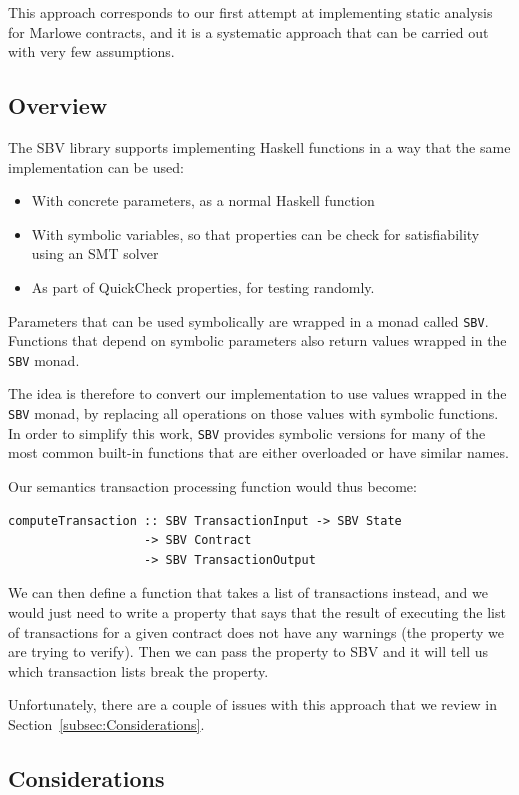 \documentclass[english,runningheads]{llncs}
\begin{document}
This approach corresponds to our first attempt at implementing static
analysis for Marlowe contracts, and it is a systematic approach that
can be carried out with very few assumptions. 

\subsection{Overview}

The SBV library supports implementing Haskell functions in a way that
the same implementation can be used:
\begin{itemize}
\item With concrete parameters, as a normal Haskell function
\item With symbolic variables, so that properties can be check for satisfiability
using an SMT solver
\item As part of QuickCheck properties, for testing randomly.
\end{itemize}
Parameters that can be used symbolically are wrapped in a monad called
\texttt{SBV}. Functions that depend on symbolic parameters also return
values wrapped in the \texttt{SBV} monad.

The idea is therefore to convert our implementation to use values
wrapped in the \texttt{SBV} monad, by replacing all operations on
those values with symbolic functions. In order to simplify this work,
\texttt{SBV} provides symbolic versions for many of the most common
built-in functions that are either overloaded or have similar names.

Our semantics transaction processing function would thus become:

\begin{verbatim}
computeTransaction :: SBV TransactionInput -> SBV State
                   -> SBV Contract
                   -> SBV TransactionOutput
\end{verbatim}

We can then define a function that takes a list of transactions instead,
and we would just need to write a property that says that the result
of executing the list of transactions for a given contract does not
have any warnings (the property we are trying to verify). Then we
can pass the property to SBV and it will tell us which transaction
lists break the property.

Unfortunately, there are a couple of issues with this approach that
we review in Section~\ref{subsec:Considerations}.

\subsection{Considerations\label{subsec:Considerations}}
\end{document}
